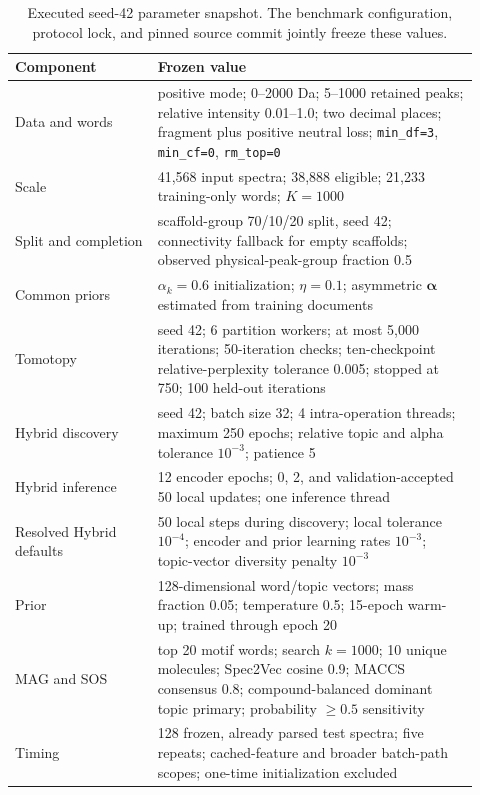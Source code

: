 \documentclass[11pt]{article}
\newcommand{\code}[1]{\texttt{#1}}
\begin{document}
\begin{table}[ht]
\centering
\small
\begin{tabular}{L{0.29\linewidth}L{0.63\linewidth}}
\toprule
Component & Frozen value \\
\midrule
Data and words & positive mode; 0--2000 Da; 5--1000 retained peaks; relative
intensity 0.01--1.0; two decimal places; fragment plus positive neutral loss;
\code{min\_df=3}, \code{min\_cf=0}, \code{rm\_top=0} \\
Scale & 41,568 input spectra; 38,888 eligible; 21,233 training-only words;
$K=1000$ \\
Split and completion & scaffold-group 70/10/20 split, seed 42; connectivity
fallback for empty scaffolds; observed physical-peak-group fraction 0.5 \\
Common priors & $\alpha_k=0.6$ initialization; $\eta=0.1$; asymmetric
$\boldsymbol\alpha$ estimated from training documents \\
Tomotopy & seed 42; 6 partition workers; at most 5,000 iterations; 50-iteration
checks; ten-checkpoint relative-perplexity tolerance 0.005; stopped at 750;
100 held-out iterations \\
Hybrid discovery & seed 42; batch size 32; 4 intra-operation threads; maximum
250 epochs; relative topic and alpha tolerance $10^{-3}$; patience 5 \\
Hybrid inference & 12 encoder epochs; 0, 2, and validation-accepted 50 local
updates; one inference thread \\
Resolved Hybrid defaults & 50 local steps during discovery; local tolerance
$10^{-4}$; encoder and prior learning rates $10^{-3}$; topic-vector diversity
penalty $10^{-3}$ \\
Prior & 128-dimensional word/topic vectors; mass fraction 0.05; temperature
0.5; 15-epoch warm-up; trained through epoch 20 \\
MAG and SOS & top 20 motif words; search $k=1000$; 10 unique molecules;
Spec2Vec cosine 0.9; MACCS consensus 0.8; compound-balanced dominant topic
primary; probability $\geq0.5$ sensitivity \\
Timing & 128 frozen, already parsed test spectra; five repeats; cached-feature
and broader batch-path scopes; one-time initialization excluded \\
\bottomrule
\end{tabular}
\caption{Executed seed-42 parameter snapshot. The benchmark configuration,
protocol lock, and pinned source commit jointly freeze these values.}
\label{tab:executed-parameters}
\end{table}
\end{document}

